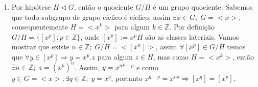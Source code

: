 \documentclass{article}
\begin{document}
\begin{enumerate}
		\item Por hipótese $H \vartriangleleft G$, então o quociente $G/H$ é um grupo quociente. Sabemos que todo subgrupo de grupo cíclico é cíclico, assim $\exists x \in G; \; G=<x>$, consequentemente $H = <x^{k}>$ para algum $k \in \mathbb{Z}$. Por definição $G/H = \{[x^{p}]: p\in \mathbb{Z}\}$, onde $[x^{p}]:=x^{p}H$ são as classes lateriais. Vamos mostrar que existe $n\in \mathbb{Z}; \; G/H = <[x^{n}]>$, assim $\forall [x^{p}] \in G/H$ temos que $\forall y \in [x^{p}] \Rightarrow  y = x^{p}.z$ para algum $z \in H$, mas como $H = <x^{k}>$, então $\exists n \in \mathbb{Z}; \; z=(x^{k})^{n}$. Assim, $y=x^{nk+p}$ e como $y \in G=<x>, \exists q \in \mathbb{Z}; \; y=x^{q}$, portanto $x^{q-p} = x^{nk} \Rightarrow [x^{q}] = [x^{p}]$.
\end{enumerate}
		
\end{document}
